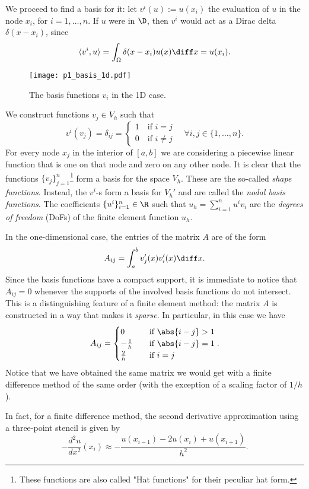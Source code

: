 We proceed to find a basis for it: let $v^i(u) := u(x_i)$ the evaluation of $u$ in the node $x_i$, for $i=1,\dots,n$. If $u$ were in $\D$, then $v^i$ would act as a Dirac delta $\delta(x-x_i)$, since
\[
\langle v^i, u \rangle = \int_\Omega \delta(x-x_i) u(x) \diff x = u(x_i).
\]
\begin{figure}[!htb]
\centering
\texttt{[image: p1\_basis\_1d.pdf]}
\caption{The basis functions $v_i$ in the 1D case.}
\label{fig:1d_basis}
\end{figure}
We construct functions $v_j \in V_h$ such that
\[
v^i(v_j) = \delta_{ij} = \begin{cases}
1 \quad \text{if } i=j \\
0 \quad \text{if } i\ne j
\end{cases}
\quad \forall i,j \in \{1,\dots,n\}.
\]
For every node $x_j$ in the interior of $[a,b]$ we are considering a piecewise linear function that is one on that node and zero on any other node. It is clear that the functions $\{v_j\}_{j=1}^{n}$\footnote{These functions are also called "Hat functions" for their peculiar hat form.} form a basis for the space $V_h$. These are the so-called \emph{shape functions}. Instead, the $v^i$-s form a basis for $V_h'$ and are called the \emph{nodal basis functions}. The coefficients $\{u^i\}_{i=1}^n\in \R$ such that $u_h = \sum_{i=1}^{n} u^i v_i$ are the \emph{degrees of freedom} (DoFs) of the finite element function $u_h$. 

In the one-dimensional case, the entries of the matrix $A$ are of the form
\[
A_{ij} = \int_a^b v_j'(x) v_i'(x) \diff x.
\]
Since the basis functions have a compact support, it is immediate to notice that $A_{ij} = 0$ whenever the supports of the involved basis functions do not intersect. This is a distinguishing feature of a finite element method: the matrix $A$ is constructed in a way that makes it \emph{sparse}. In particular, in this case we have
\[
A_{ij} = \begin{cases}
0 \quad &\text{if } \abs{i-j}>1 \\
-\frac{1}{h} \quad &\text{if } \abs{i-j}=1 \\
\frac{2}{h} \quad &\text{if } i=j
\end{cases}.
\]
Notice that we have obtained the same matrix we would get with a finite difference method of the same order (with the exception of a scaling factor of $1/h$).

In fact, for a finite difference method, the second derivative approximation using a three-point stencil is given by
\[
-\frac{d^2 u}{dx^2}(x_i) \approx -\frac{u(x_{i-1}) - 2u(x_i) + u(x_{i+1})}{h^2}.
\]

